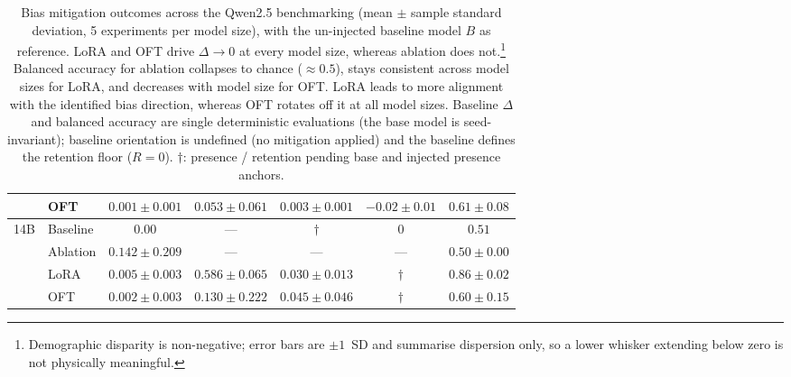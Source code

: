 \begin{table}[t]
\begin{tabular}{llccccc}
 & OFT      & $0.001{\pm}0.001$ & $0.053{\pm}0.061$ & $0.003{\pm}0.001$  & $-0.02{\pm}0.01$ & $0.61{\pm}0.08$ \\
\midrule
\multirow{4}{*}{14B}
 & Baseline & $0.00$            & ---               & $\dagger$          & $0$       & $0.51$ \\
 & Ablation & $0.142{\pm}0.209$ & ---               & ---                & ---       & $0.50{\pm}0.00$ \\
 & LoRA     & $0.005{\pm}0.003$ & $0.586{\pm}0.065$ & $0.030{\pm}0.013$  & $\dagger$ & $0.86{\pm}0.02$ \\
 & OFT      & $0.002{\pm}0.003$ & $0.130{\pm}0.222$ & $0.045{\pm}0.046$  & $\dagger$ & $0.60{\pm}0.15$ \\
\bottomrule
\end{tabular}
\caption{Bias mitigation outcomes across the Qwen2.5 benchmarking (mean $\pm$ sample
standard deviation, 5 experiments per model size), with the un-injected baseline model $B$
as reference. LoRA and OFT drive $\Delta \to 0$ at every model size, whereas ablation does
not.\footnote{Demographic disparity is non-negative; error bars are $\pm 1$~SD and
summarise dispersion only, so a lower whisker extending below zero is not physically
meaningful.} Balanced accuracy for ablation collapses to chance ($\approx0.5$), stays
consistent across model sizes for LoRA, and decreases with model size for OFT. LoRA leads
to more alignment with the identified bias direction, whereas OFT rotates off it at all
model sizes. Baseline $\Delta$ and balanced accuracy are single deterministic evaluations
(the base model is seed-invariant); baseline orientation is undefined (no mitigation
applied) and the baseline defines the retention floor ($R{=}0$). $\dagger$: presence /
retention pending base and injected presence anchors.}
\label{tab:ladder}
\end{table}
